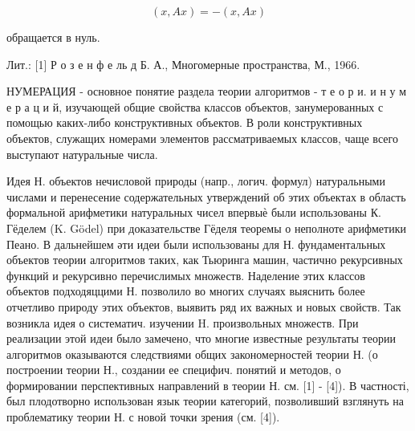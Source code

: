 \documentclass[10pt]{article}
\begin{document}
\[

(x, A x)=-(x, A x)

\]



обращается в нуль.



Лит.: [1] Р о з е н ф е ль д Б. А., Многомерные пространства, М., 1966.



НУМЕРАЦИЯ - основное понятие раздела теории алгоритмов - т е о р и. и н у м е р а ц и й, изучающей общие свойства классов объектов, занумерованных с помощью каких-либо конструктивных объектов. В роли конструктивных объектов, служащих номерами элементов рассматриваемых классов, чаще всего выступают натуральные числа.



Идея Н. объектов нечисловой природы (напр., логич. формул) натуральными числами и перенесение содержательных утверждений об этих объектах в область формальной арифметики натуральных чисел впервыѐ были использованы К. Гёделем (K. Gödel) при доказательстве Гёделя теоремы о неполноте арифметики Пеано. В дальнейшем әти идеи были использованы для Н. фундаментальных объектов теории алгоритмов таких, как Тьюринга машин, частично рекурсивных функций и рекурсивно перечислимых множеств. Наделение этих классов объектов подходяццими Н. позволило во многих случаях выяснить более отчетливо природу этих объектов, выявить ряд их важных и новых свойств. Так возникла идея о систематич. изучении $\mathrm{H}$. произвольных множеств. При реализации этой идеи было замечено, что многие известные результаты теории алгоритмов оказываются следствиями общих закономерностей теории Н. (о построении теории Н., создании ее специфич. понятий и методов, о формировании перспективных направлений в теории Н. см. [1] - [4]). В частності, был плодотворно использован язык теории категорий, позволивший взглянуть на проблематику теории Н. с новой точки зрения (см. [4]).
\end{document}
